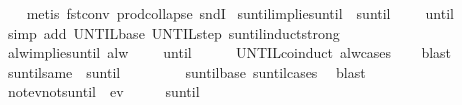 \begin{isabellebody}
%
\isadelimproof
\ \ %
\endisadelimproof
%
\isatagproof
{}\isamarkupfalse%
\ {\isacharparenleft}metis\ fst{\isacharunderscore}conv\ prod{\isachardot}collapse\ sndI{\isacharparenright}%
\endisatagproof
{\isafoldproof}%
%
\isadelimproof
\isanewline
%
\endisadelimproof
\isanewline
{}\isamarkupfalse%
\ suntil{\isacharunderscore}implies{\isacharunderscore}until{\isacharcolon}\ {\isachardoublequoteopen}{\isacharparenleft}{\isasymphi}\ suntil\ {\isasympsi}{\isacharparenright}\ {\isasymomega}\ {\isasymLongrightarrow}\ {\isacharparenleft}{\isasymphi}\ until\ {\isasympsi}{\isacharparenright}\ {\isasymomega}{\isachardoublequoteclose}\isanewline
%
\isadelimproof
\ \ %
\endisadelimproof
%
\isatagproof
{}\isamarkupfalse%
\ {\isacharparenleft}simp\ add{\isacharcolon}\ UNTIL{\isachardot}base\ UNTIL{\isachardot}step\ suntil{\isacharunderscore}induct{\isacharunderscore}strong{\isacharparenright}%
\endisatagproof
{\isafoldproof}%
%
\isadelimproof
\isanewline
%
\endisadelimproof
\isanewline
\isanewline
{}\isamarkupfalse%
\ alw{\isacharunderscore}implies{\isacharunderscore}until{\isacharcolon}\ {\isachardoublequoteopen}alw\ {\isasymphi}\ {\isasymomega}\ {\isasymLongrightarrow}\ {\isacharparenleft}{\isasymphi}\ until\ {\isasympsi}{\isacharparenright}\ {\isasymomega}{\isachardoublequoteclose}\isanewline
%
\isadelimproof
\ \ %
\endisadelimproof
%
\isatagproof
{}\isamarkupfalse%
\ UNTIL{\isachardot}coinduct\ alw{\isachardot}cases\isanewline
\ \ \isamarkupfalse%
\ blast%
\endisatagproof
{\isafoldproof}%
%
\isadelimproof
\isanewline
%
\endisadelimproof
\isanewline
{}\isamarkupfalse%
\ suntil{\isacharunderscore}same{\isacharcolon}\ {\isachardoublequoteopen}{\isacharparenleft}{\isasymphi}\ suntil\ {\isasymphi}{\isacharparenright}\ {\isasymomega}\ {\isacharequal}\ {\isasymphi}\ {\isasymomega}{\isachardoublequoteclose}\isanewline
%
\isadelimproof
\ \ %
\endisadelimproof
%
\isatagproof
{}\isamarkupfalse%
\ suntil{\isachardot}base\ suntil{\isachardot}cases\ \isamarkupfalse%
\ blast%
\endisatagproof
{\isafoldproof}%
%
\isadelimproof
\isanewline
%
\endisadelimproof
\isanewline
{}\isamarkupfalse%
\ not{\isacharunderscore}ev{\isacharunderscore}not{\isacharunderscore}suntil{\isacharcolon}\ {\isachardoublequoteopen}{\isasymnot}\ ev\ {\isasympsi}\ {\isasymomega}\ {\isasymLongrightarrow}\ {\isasymnot}\ {\isacharparenleft}{\isacharparenleft}{\isasymphi}\ suntil\ {\isasympsi}{\isacharparenright}\ {\isasymomega}{\isacharparenright}{\isachardoublequoteclose}\isanewline

\end{isabellebody}
